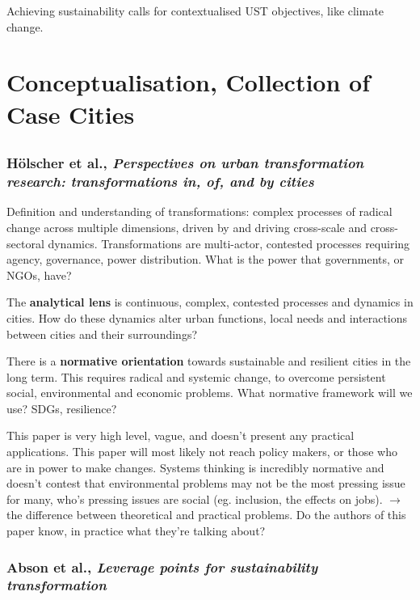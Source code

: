 \documentclass{article}
\begin{document}
Achieving sustainability calls for contextualised UST objectives, like climate change.

\section{Conceptualisation, Collection of Case Cities}

\subsection{}

\subsubsection{Hölscher et al., \textit{Perspectives on urban transformation research: transformations in, of, and by cities}}

Definition and understanding of transformations: complex processes of radical change across multiple dimensions, driven by and driving cross-scale and cross-sectoral dynamics. Transformations are multi-actor, contested processes requiring agency, governance, power distribution. What is the power that governments, or NGOs, have?

The \textbf{analytical lens} is continuous, complex, contested processes and dynamics in cities. How do these dynamics alter urban functions, local needs and interactions between cities and their surroundings?

There is a \textbf{normative orientation} towards sustainable and resilient cities in the long term. This requires radical and systemic change, to overcome persistent social, environmental and economic problems. What normative framework will we use? SDGs, resilience? 

This paper is very high level, vague, and doesn't present any practical applications. This paper will most likely not reach policy makers, or those who are in power to make changes. Systems thinking is incredibly normative and doesn't contest that environmental problems may not be the most pressing issue for many, who's pressing issues are social (eg. inclusion, the effects on jobs). $\rightarrow$ the difference between theoretical and practical problems. Do the authors of this paper know, in practice what they're talking about?

\subsubsection{Abson et al., \textit{Leverage points for sustainability transformation}}
\end{document}
